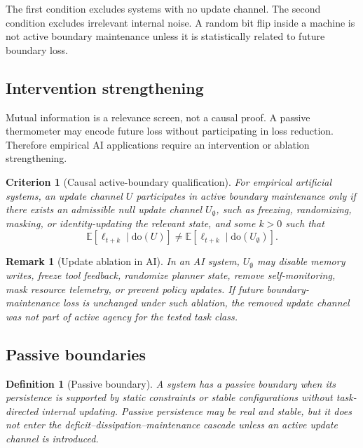 \documentclass[10pt,a4paper,twocolumn,aps,prl]{revtex4-2}
\newtheorem{definition}{Definition}
\newtheorem{criterion}{Criterion}
\newtheorem{remark}{Remark}
\newcommand{\E}{\mathbb{E}}
\newcommand{\doop}{\mathrm{do}}
\begin{document}
The first condition excludes systems with no update channel. The second condition excludes irrelevant internal noise. A random bit flip inside a machine is not active boundary maintenance unless it is statistically related to future boundary loss.

\subsection{Intervention strengthening}

Mutual information is a relevance screen, not a causal proof. A passive thermometer may encode future loss without participating in loss reduction. Therefore empirical AI applications require an intervention or ablation strengthening.

\begin{criterion}[Causal active-boundary qualification]
For empirical artificial systems, an update channel $U$ participates in active boundary maintenance only if there exists an admissible null update channel $U_{\emptyset}$, such as freezing, randomizing, masking, or identity-updating the relevant state, and some $k>0$ such that
\begin{equation}
\E[\ell_{t+k}\mid \doop(U)]\neq \E[\ell_{t+k}\mid \doop(U_{\emptyset})].
\label{eq:do-ablation}
\end{equation}
\end{criterion}

\begin{remark}[Update ablation in AI]
In an AI system, $U_{\emptyset}$ may disable memory writes, freeze tool feedback, randomize planner state, remove self-monitoring, mask resource telemetry, or prevent policy updates. If future boundary-maintenance loss is unchanged under such ablation, the removed update channel was not part of active agency for the tested task class.
\end{remark}

\subsection{Passive boundaries}

\begin{definition}[Passive boundary]
A system has a passive boundary when its persistence is supported by static constraints or stable configurations without task-directed internal updating. Passive persistence may be real and stable, but it does not enter the deficit--dissipation--maintenance cascade unless an active update channel is introduced.
\end{definition}
\end{document}
